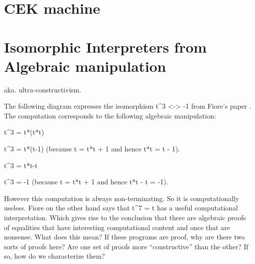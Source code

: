 \documentclass{llncs}
\begin{document}
\section{CEK machine}






\newpage
\section{Isomorphic Interpreters from Algebraic manipulation}

aka. ultra-constructivism. 

\begin{center}
\end{center}

The following diagram expresses the isomorphism {{t^3 <-> -1}} from
Fiore's paper \cite{Fiore:2004}. The computation corresponds to the
following algebraic manipulation:

{{t^3 = t*(t*t)}}

{{t^3 = t*(t-1)}} (because {{t = t*t + 1}}  and hence {{t*t = t - 1}}). 

{{t^3 = t*t-t}}

{{t^3 = -1}} (because {{t = t*t + 1}}  and hence {{t*t - t = -1}}). 

However this computation is always non-terminating. So it is
computationally useless. Fiore on the other hand says that {{t^7 = t}}
has a useful computational interpretation. Which gives rise to the
conclusion that there are algebraic proofs of equalities that have
interesting computational content and once that are nonsense. What
does this mean? If these programs are proof, why are there two sorts
of proofs here? Are one set of proofs more ``constructive'' than the
other? If so, how do we characterize them?






 

\end{document}
